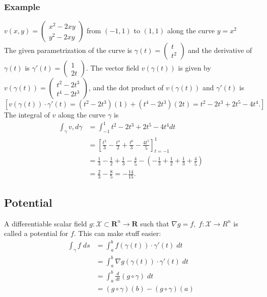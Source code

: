 \documentclass[8pt]{extarticle}
\newcommand{\R}{{\mathbb R}}
\newcommand{\X}{{\mathcal X}}
\newcommand{\ra}{{\rightarrow}}
\def\R{\mathbf{R}}
\begin{document}
\begin{multicols*}{3}
\begin{tcolorbox}[colback=blue!5!white,colframe=blue!75!black]
\subsubsection{Example}
$v(x, y) = \begin{pmatrix}
    x^2 - 2xy\\
    y^2 - 2xy
  \end{pmatrix}$
from $(-1, 1)$ to $(1, 1)$ along the curve $y = x^2$ \\
The given parametrization of the curve is 
$\gamma(t) = \begin{pmatrix} 
	t \\ 
	t^2 
	\end{pmatrix}$
and the derivative of $\gamma(t)$ is 
$\gamma'(t) = \begin{pmatrix}
	 1 \\
	 2t \end{pmatrix}$. 
The vector field $v(\gamma(t))$ is given by 
$v(\gamma(t)) = 
	\begin{pmatrix} 
	t^2 - 2t^3 \\
	 t^4 - 2t^3 
	\end{pmatrix}$,
 and the dot product of $v(\gamma(t))$ and $\gamma'(t)$ is
$$[v(\gamma(t)) \cdot \gamma'(t) = (t^2 - 2t^3)(1) + (t^4 - 2t^3)(2t) = t^2 - 2t^3 + 2t^5 - 4t^4.]$$
The integral of $v$ along the curve $\gamma$ is
\begin{align*}
	\int_\gamma v , d\gamma &= \int_{-1}^1 t^2 - 2t^3 + 2t^5 - 4t^4  dt \\
	&= \left[\frac{t^3}{3} - \frac{t^4}{2} + \frac{t^6}{3} - \frac{4t^5}{5}\right]_{t=-1}^1 \\
	&= \frac{1}{3} - \frac{1}{2} + \frac{1}{3} - \frac{4}{5} - \left(-\frac{1}{3} + \frac{1}{2} + \frac{1}{3} + \frac{4}{5}\right) \\
	&= \frac{2}{3} - \frac{8}{5} = -\frac{14}{15}.
\end{align*}
\end{tcolorbox}

  \subsection{Potential}
  A differentiable scalar field $g: \X \subset \R^n \ra \R$
  such that $\nabla g = f, \; f: \X \ra R^n$ is called
  a potential for $f$. This can make stuff easier:
  \begin{align*}
    \int_\gamma f \; ds & = \int_a^b f(\gamma(t)) \cdot \gamma'(t) \; dt        \\
                        & = \int_a^b \nabla g(\gamma(t)) \cdot \gamma'(t) \; dt \\
                        & = \int_a^b \frac{d}{dt} (g \circ \gamma) \; dt        \\
                        & = (g \circ \gamma)(b) - (g \circ \gamma)(a)
  \end{align*}
\begin{tcolorbox}[colback=blue!5!white,colframe=blue!75!black]

\end{tcolorbox}
\end{multicols*}
\end{document}
